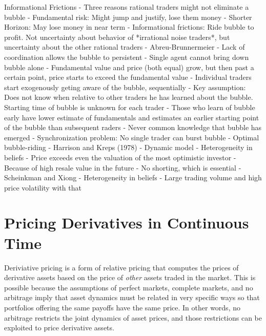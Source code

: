\documentclass[12pt]{article}
\theoremstyle{plain}
\theoremstyle{definition}
\theoremstyle{remark}
\begin{document}
Informational Frictions
- Three reasons rational traders might not eliminate a bubble
  - Fundamental risk: Might jump and justify, lose them money
  - Shorter Horizon: May lose money in near term
  - Informational frictions: Ride bubble to profit. Not uncertainty
    about behavior of *irrational noise traders*, but uncertainty about
    the other rational traders
- Abreu-Brunnermeier
  - Lack of coordination allows the bubble to persistent
  - Single agent cannot bring down bubble alone
  - Fundamental value and price (both equal) grow, but then past a
    certain point, price starts to exceed the fundamental value
  - Individual traders start exogenously geting aware of the bubble,
    sequentially
  - Key assumption: Does not know when relative to other traders he has
    learned about the bubble. Starting time of bubble is unknown for
    each trader
  - Those who learn of bubble early have lower estimate of fundamentals
    and estimates an earlier starting point of the bubble than
    subsequent raders
  - Never common knowledge that bubble has emerged
  - Synchronization problem: No single trader can burst bubble
  - Optimal bubble-riding
- Harrison and Kreps (1978)
  - Dynamic model
  - Heterogeneity in beliefs
  - Price exceeds even the valuation of the most optimistic investor
  - Because of high resale value in the future
  - No shorting, which is essential
- Scheinkman and Xiong
  - Heterogeneity in beliefs
  - Large trading volume and high price volatility with that







\clearpage
\section{Pricing Derivatives in Continuous Time}

Deriviative pricing is a form of relative pricing that computes the
prices of derivative assets based on the price of \emph{other} assets
traded in the market. This is possible because the assumptions of
perfect markets, complete markets, and no arbitrage imply that asset
dynamics must be related in very specific ways so that portfolios
offering the same payoffs have the same price. In other words, no
arbitrage restricts the joint dynamics of asset prices, and those
restrictions can be exploited to price derivative assets.
\end{document}
